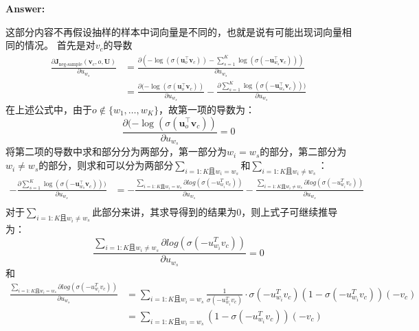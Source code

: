\documentclass{article}
\newenvironment{answer}{
    {\bf Answer:} \sf \begingroup \color{red}%
}{\par\endgroup}%
\begin{document}
\begin{enumerate}[label=(\alph*)]
\begin{shaded}
\begin{answer}
这部分内容不再假设抽样的样本中词向量是不同的，也就是说有可能出现词向量相同的情况。
首先是对$v_c$的导数
\begin{equation}
\begin{array}{cl}
		\frac{\partial \bm J_{\text{neg-sample}}(\bm v_c, o, \bm U)}{\partial u_{w_s}} &= \frac{ \partial (-\log(\sigma(\bm u_o^\top \bm v_c)) - \sum_{s=1}^K \log(\sigma(-\bm u_{w_s}^\top \bm v_c)))} {\partial u_{w_s}}\\
		&=\frac{ \partial (-\log(\sigma(\bm u_o^\top \bm v_c))}{\partial u_{w_s}} - \frac{\partial \sum_{s=1}^K \log(\sigma(-\bm u_{w_s}^\top \bm v_c)))}{\partial u_{w_s}}
\end{array}
\end{equation}
在上述公式中，由于$o \notin \{w_1,\dots,w_K\}$，故第一项的导数为：
\begin{equation}
		\frac{ \partial (-\log(\sigma(\bm u_o^\top \bm v_c))}{\partial u_{w_s}} =  0
\end{equation}
将第二项的导数中求和部分分为两部分，第一部分为$w_i =w_s$的部分，第二部分为$w_i \neq w_s$的部分，则求和可以分为两部分$\sum_{i=1:K \text{且} w_i=w_s}$和$\sum_{i=1:K \text{且} w_i\neq w_s}$：
\begin{equation}
	\begin{array}{cl}
		-\frac{\partial \sum_{s=1}^K \log(\sigma(-\bm u_{w_s}^\top \bm v_c)))}{\partial u_{w_s}} &= -\frac{\sum_{i=1:K \text{且} w_i=w_s} \partial log(\sigma(-u_{w_i}^T v_c))}{\partial  u_{w_s}} - \frac{\sum_{i=1:K \text{且} w_i\neq w_s}\partial log(\sigma(-u_{w_i}^T v_c))}{\partial u_{w_s}}\\
	\end{array}
\end{equation}
对于$\sum_{i=1:K \text{且} w_i\neq w_s}$此部分来讲，其求导得到的结果为0，则上式子可继续推导为：
\begin{equation}
	\frac{\sum_{i=1:K \text{且} w_i\neq w_s}\partial log(\sigma(-u_{w_i}^T v_c))}{\partial u_{w_s}} = 0
\end{equation}
和
\begin{equation}
	\begin{array}{cl}
		\frac{\sum_{i=1:K \text{且} w_i=w_s} \partial log(\sigma(-u_{w_i}^T v_c))}{\partial  u_{w_s}} &= \sum_{i=1:K \text{且} w_i=w_s}\frac{1}{\sigma(-u_{w_i}^T v_c)} \cdot \sigma(-u_{w_i}^T v_c) (1- \sigma(-u_{w_i}^T v_c)) (-v_c) \\
		&= \sum_{i=1:K \text{且} w_i=w_s}(1-\sigma(-u_{w_i}^T v_c))(-v_c)
	\end{array}
\end{equation}


\end{answer}
\end{shaded}
\end{enumerate}
\end{document}
